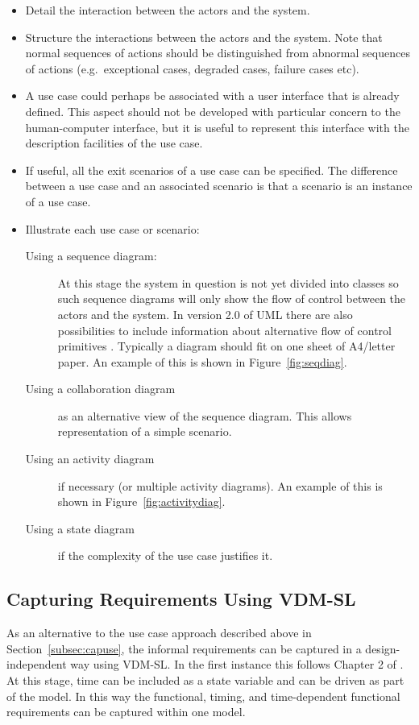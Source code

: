 \documentclass{overturerepchap}
\begin{document}
\begin{itemize}
\item Detail the interaction between the actors and the system.
\item Structure the interactions between the actors and the
system. Note that normal sequences of actions should be distinguished
from abnormal sequences of actions (e.g.\ exceptional cases, degraded
cases, failure cases etc).
\item A use case could perhaps be associated with a user interface
that is already defined. This aspect should not be developed with
particular concern to the human-computer interface, but it is useful
to represent this interface with the description facilities of the use
case.
\item If useful, all the exit scenarios of a use case can be
specified. The difference between a use case and an associated
scenario is that a scenario is an instance of a use case.
\item Illustrate each use case or scenario:
\begin{description}
\item[Using a sequence diagram:] At this stage the system in question
is not yet divided into classes so such sequence diagrams will only
show the flow of control between the actors and the system. In version
2.0 of UML there are also possibilities to include information about
alternative flow of control primitives \cite{UML20}. Typically a
diagram should fit on one sheet of A4/letter paper. An example of this
is shown in Figure~\ref{fig:seqdiag}.
\item[Using a collaboration diagram] as an alternative view of the
sequence diagram. This allows representation of a simple scenario.
\item[Using an activity diagram] if necessary (or multiple activity
diagrams). An example of this is shown in
Figure~\ref{fig:activitydiag}.
\item[Using a state diagram] if the complexity of the use case
justifies it.
\end{description}
\end{itemize}

\subsection{Capturing Requirements Using VDM-SL}\label{subsec:captureVDM}
\label{subsec:VDMSL}

As an alternative to the use case approach described above in
Section~\ref{subsec:capuse}, the informal requirements can be captured
in a design-independent way using VDM-SL. In the first instance this
follows Chapter 2 of \cite{Fitzgerald&98b,Fitzgerald&05}. At this
stage, time can be included as a state variable and can be driven as
part of the model. In this way the functional, timing, and
time-dependent functional requirements can be captured within one
model.
\end{document}
